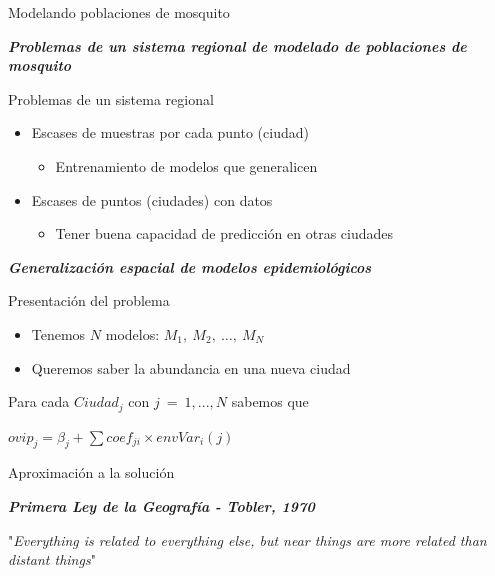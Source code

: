 \documentclass[10pt]{beamer}
\newcommand\IncrFont{\fontsize{20}{20}\selectfont}
\begin{document}
\begin{frame}{Modelando poblaciones de mosquito}
  \IncrFont
  \begin{center}
    \textit{\textbf{Problemas de un sistema regional de modelado de poblaciones de mosquito}}
  \end{center}
\end{frame}





\begin{frame}{Problemas de un sistema regional}
  \begin{itemize}[<+->]
    \item Escases de muestras por cada punto (ciudad)
    \begin{itemize}
      \item Entrenamiento de modelos que generalicen
    \end{itemize}
    \item Escases de puntos (ciudades) con datos
    \begin{itemize}
      \item Tener buena capacidad de predicción en otras ciudades
    \end{itemize}

  \end{itemize}
\end{frame}


\begin{frame}{}
  \IncrFont
  \begin{center}
    \textit{\textbf{Generalización espacial de modelos epidemiológicos}}
  \end{center}
\end{frame}


\begin{frame}{Presentación del problema}
  \begin{itemize}[<+->]
    \item Tenemos $N$ modelos: $M_{1},\ M_{2},\ \dots,\ M_{N}$
    \item Queremos saber la abundancia en una nueva ciudad
  \end{itemize}
  \pause

  Para cada $Ciudad_{j}$ con $j\ =\ 1, ..., N$ sabemos que
  \begin{center}
    $ovip_{j} = \beta_{j} + \sum{}{coef_{ji} \times envVar_{i}(j)}$
  \end{center}
\end{frame}

\begin{frame}{Aproximación a la solución}
  \begin{center}
    \fontsize{15}{15}\selectfont
    \textbf{\textit{Primera Ley de la Geografía - Tobler, 1970}}
  \end{center}
  "\textit{Everything is related to everything else, but near things are more related
  than distant things}"
\end{frame}
\end{document}
